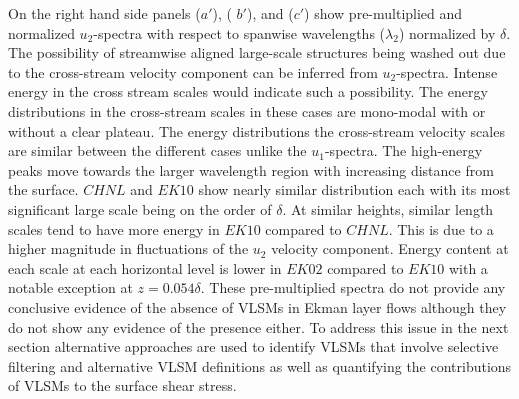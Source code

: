 \documentclass{svjour3}                     %
\begin{document}
On the right hand side panels  ($a'$), ( $b'$), and ($c'$) show pre-multiplied and normalized $u_2$-spectra with respect to spanwise wavelengths ($\lambda_2$) normalized by $\delta$. The possibility  of streamwise aligned large-scale structures  being washed out due to the cross-stream velocity component can be inferred from $u_2$-spectra. Intense energy in the cross stream scales would indicate such a possibility. The energy  distributions in the cross-stream scales in these cases are mono-modal with or without a clear plateau. The energy distributions the cross-stream velocity scales are similar between the different cases unlike the $u_1$-spectra. The high-energy peaks move towards the larger wavelength region with increasing distance from the surface. $CHNL$ and $EK10$  show nearly similar distribution each with its most significant large scale being on the order of $\delta$. At similar heights,  similar length scales tend to have more energy in $EK10$ compared to $CHNL$. This is due to a higher magnitude in fluctuations of the $u_2$ velocity component. Energy content at each scale at each horizontal level is lower in $EK02$ compared to $EK10$ with a notable exception at $z= 0.054\delta$. These pre-multiplied spectra do not provide any conclusive evidence of the absence of VLSMs in Ekman layer  flows although they do not show any evidence of the presence either.  To address this issue in the next section alternative approaches are used to identify VLSMs that involve selective filtering and alternative VLSM definitions as well as quantifying the contributions of VLSMs to the surface shear stress.
\noindent  
\end{document}
